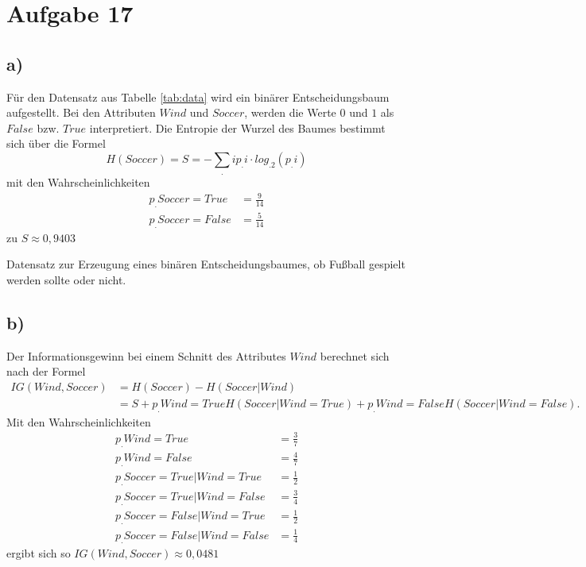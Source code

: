 \section{Aufgabe 17}
\label{sec:Aufgabe17}

\subsection*{a)}
Für den Datensatz aus Tabelle \ref{tab:data} wird ein binärer Entscheidungsbaum aufgestellt. Bei den Attributen $Wind$ und $Soccer$, werden die Werte $0$ und $1$ als $False$ bzw. $True$ interpretiert.
Die Entropie der Wurzel des Baumes bestimmt sich über die Formel
\begin{equation}
H(Soccer)= S = -\sum_.i p_.i\cdot log_.2(p_.i)
\end{equation}
mit den Wahrscheinlichkeiten
\begin{align*}
p_.{Soccer = True} &= \frac{9}{14}\\
p_.{Soccer = False} &= \frac{5}{14}
\end{align*}
zu $S\approx 0,9403$

\begin{table}
	\centering
	\caption{Datensatz zur Erzeugung eines binären Entscheidungsbaumes, ob Fußball gespielt werden sollte oder nicht.}
	
	\label{tab:data}
\end{table}

\subsection*{b)}
Der Informationsgewinn bei einem Schnitt des Attributes $Wind$ berechnet sich nach der Formel
\begin{align}
IG(Wind,Soccer) &= H(Soccer) - H(Soccer|Wind)\\
&= S + p_.{Wind = True} H(Soccer|Wind = True )+ p_.{Wind = False} H(Soccer|Wind = False)\text{.}
\end{align}	
Mit den Wahrscheinlichkeiten
\begin{align*}
p_.{Wind = True} &= \frac{3}{7}\\
p_.{Wind = False} &= \frac{4}{7}\\
p_.{Soccer = True|Wind = True} &= \frac{1}{2}\\
p_.{Soccer = True|Wind = False} &= \frac{3}{4}\\
p_.{Soccer = False|Wind = True} &= \frac{1}{2}\\
p_.{Soccer = False|Wind = False} &= \frac{1}{4}
\end{align*}
ergibt sich so $IG(Wind,Soccer)\approx 0,0481$

